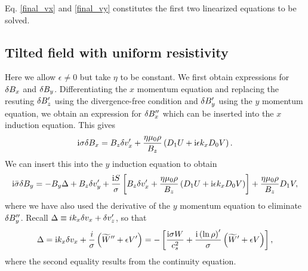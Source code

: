 Eq. \ref{final_vx} and \ref{final_vy} constitutes the first two
linearized equations to be solved.

\subsection{Tilted field with uniform resistivity}
Here we allow $\epsilon\neq 0$ but take $\eta$ to be constant. We
first obtain expressions for $\delta B_x$ and $\delta B_y$. Differentiating
the $x$ momentum equation and replacing the resuting $\delta B_z^\prime$
using the divergence-free condition and $\delta B_y^\prime$ using the $y$
momentum equation, we obtain an expression for $\delta B_x^{\prime\prime}$
which can be inserted into the $x$ induction equation. This gives
\begin{align}
  \mathrm{i}\sigma\delta B_x = B_z\delta v_x^\prime +
  \frac{\eta\mu_0\rho}{B_z}\left( D_1 U + \mathrm{i}\epsilon k_x D_0
  V\right).\label{bx_tilted}  
\end{align}
We can insert this into the $y$ induction equation to obtain
\begin{align}
  \mathrm{i}\bar{\sigma}\delta B_y = -B_y\Delta + B_z\delta v_y^\prime + \frac{\mathrm{i}
    S}{\sigma}\left[ B_z \delta v_x^\prime+ \frac{\eta\mu_0\rho}{B_z}\left( D_1 U + \mathrm{i}\epsilon k_x D_0
  V\right)\right] + \frac{\eta\mu_0\rho}{B_z}D_1V,\label{by_tilted}
\end{align} 
where we have also used the derivative of the $y$ momentum equation to
eliminate  $\delta B_y^{\prime\prime}$. Recall $\Delta \equiv i k_x \delta v_x +
\delta v_z^\prime$, so that
\begin{align}
  \Delta = \mathrm{i} k_x \delta v_x + \frac{i}{\sigma}\left(\widetilde{W}^{\prime\prime} +
  \epsilon V^\prime\right) = -\left[\frac{\mathrm{i}\sigma W}{c_s^2} +
    \frac{\mathrm{i}\left(\ln{\rho}\right)^\prime}{\sigma}\left(\widetilde{W}^\prime +
    \epsilon V\right)\right], 
\end{align}
where the second equality results from the continuity equation. 

